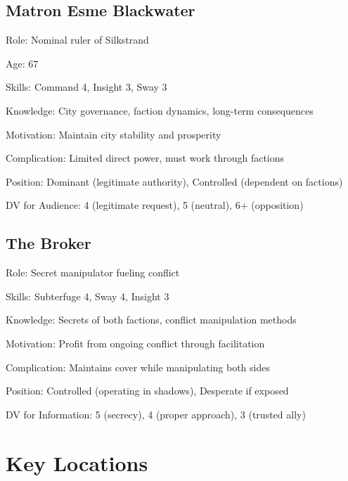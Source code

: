 \documentclass[11pt]{article}
\newenvironment{npc}[1]{\begin{description}[leftmargin=*,style=standard]\item[\textbf{#1}]}{\end{description}}
\begin{document}
\subsection{Matron Esme Blackwater}
\begin{npc}{Matron Esme Blackwater}
\item[Role:] Nominal ruler of Silkstrand
\item[Age:] 67
\item[Skills:] Command 4, Insight 3, Sway 3
\item[Knowledge:] City governance, faction dynamics, long-term consequences
\item[Motivation:] Maintain city stability and prosperity
\item[Complication:] Limited direct power, must work through factions
\item[Position:] Dominant (legitimate authority), Controlled (dependent on factions)
\item[DV for Audience:] 4 (legitimate request), 5 (neutral), 6+ (opposition)
\end{npc}

\subsection{The Broker}
\begin{npc}{The Broker}
\item[Role:] Secret manipulator fueling conflict
\item[Skills:] Subterfuge 4, Sway 4, Insight 3
\item[Knowledge:] Secrets of both factions, conflict manipulation methods
\item[Motivation:] Profit from ongoing conflict through facilitation
\item[Complication:] Maintains cover while manipulating both sides
\item[Position:] Controlled (operating in shadows), Desperate if exposed
\item[DV for Information:] 5 (secrecy), 4 (proper approach), 3 (trusted ally)
\end{npc}

\section{Key Locations}
\end{document}
